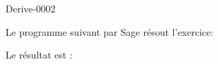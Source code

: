 
\begin{corrige}{Derive-0002}

Le programme suivant par Sage résout l'exercice:

Le résultat est :


\end{corrige}
